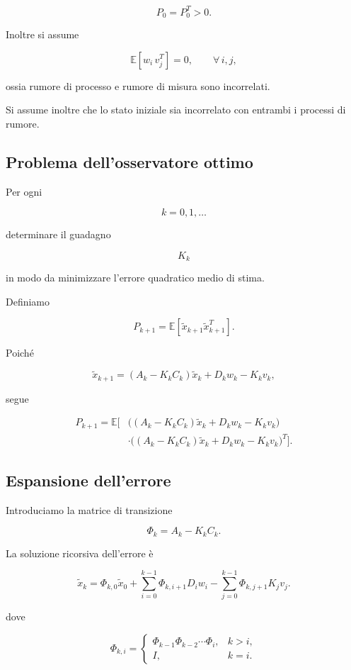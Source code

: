 \documentclass[11pt,a4paper]{article}
\begin{document}
\[
P_0=P_0^T>0.
\]

Inoltre si assume

\[
\boxed{
\mathbb{E}[w_i\,v_j^{T}]=0,
\qquad
\forall\,i,j,
}
\]

ossia rumore di processo e rumore di misura sono incorrelati.

Si assume inoltre che lo stato iniziale sia incorrelato con entrambi i processi di rumore.

\subsection*{Problema dell'osservatore ottimo}

Per ogni

\[
k=0,1,\ldots
\]

determinare il guadagno

\[
K_k
\]

in modo da minimizzare l'errore quadratico medio di stima.

Definiamo

\[
\boxed{
P_{k+1}
=
\mathbb{E}
\!\left[
\tilde{x}_{k+1}
\tilde{x}_{k+1}^{T}
\right].
}
\]

Poiché

\[
\tilde{x}_{k+1}
=
(A_k-K_kC_k)\tilde{x}_k
+
D_kw_k
-
K_kv_k,
\]

segue

\[
\begin{aligned}
P_{k+1}
=
\mathbb{E}
\Big[
&
\big(
(A_k-K_kC_k)\tilde{x}_k
+D_kw_k
-K_kv_k
\big)
\\
&
\cdot
\big(
(A_k-K_kC_k)\tilde{x}_k
+D_kw_k
-K_kv_k
\big)^T
\Big].
\end{aligned}
\]

\subsection*{Espansione dell'errore}

Introduciamo la matrice di transizione

\[
\Phi_k=A_k-K_kC_k.
\]

La soluzione ricorsiva dell'errore è

\[
\boxed{
\tilde{x}_k
=
\Phi_{k,0}\tilde{x}_0
+
\sum_{i=0}^{k-1}
\Phi_{k,i+1}D_iw_i
-
\sum_{j=0}^{k-1}
\Phi_{k,j+1}K_jv_j.
}
\]

dove

\[
\Phi_{k,i}
=
\begin{cases}
\Phi_{k-1}\Phi_{k-2}\cdots\Phi_i,
& k>i,\\[2mm]
I,
& k=i.
\end{cases}
\]
\end{document}
